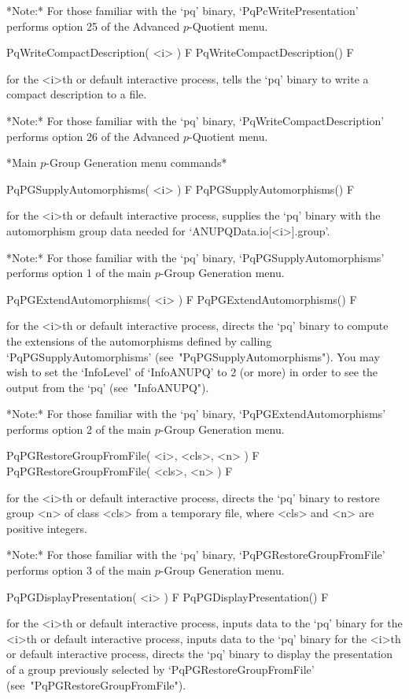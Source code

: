 *Note:* For those familiar with the `pq' binary,  `PqPcWritePresentation'
performs option 25 of the Advanced $p$-Quotient menu.

\>PqWriteCompactDescription( <i> ) F
\>PqWriteCompactDescription() F

for the <i>th or default interactive {\ANUPQ}  process,  tells  the  `pq'
binary to write a compact description to a file.

*Note:* 
For those familiar  with  the  `pq'  binary,  `PqWriteCompactDescription'
performs option 26 of the Advanced $p$-Quotient menu.

*Main $p$-Group Generation menu commands*

\>PqPGSupplyAutomorphisms( <i> ) F
\>PqPGSupplyAutomorphisms() F

for the <i>th or default interactive {\ANUPQ} process, supplies the  `pq'
binary    with    the    automorphism    group    data     needed     for
`ANUPQData.io[<i>].group'.

*Note:*
For  those  familiar  with  the  `pq'  binary,  `PqPGSupplyAutomorphisms'
performs option 1 of the main $p$-Group Generation menu.

\>PqPGExtendAutomorphisms( <i> ) F
\>PqPGExtendAutomorphisms() F

for the <i>th or default interactive {\ANUPQ} process, directs  the  `pq'
binary to compute the extensions of the automorphisms defined by  calling
`PqPGSupplyAutomorphisms' (see~"PqPGSupplyAutomorphisms"). You  may  wish
to set the `InfoLevel' of `InfoANUPQ' to 2 (or more) in order to see  the
output from the `pq' (see~"InfoANUPQ").

*Note:*    
For  those  familiar  with  the  `pq'  binary,  `PqPGExtendAutomorphisms'
performs option 2 of the main $p$-Group Generation menu. 

\>PqPGRestoreGroupFromFile( <i>, <cls>, <n> ) F
\>PqPGRestoreGroupFromFile( <cls>, <n> ) F

for the <i>th or default interactive {\ANUPQ} process, directs  the  `pq'
binary to restore group <n> of class <cls> from a temporary  file,  where
<cls> and <n> are positive integers.

*Note:* 
For those  familiar  with  the  `pq'  binary,  `PqPGRestoreGroupFromFile'
performs option 3 of the main $p$-Group Generation menu.

\>PqPGDisplayPresentation( <i> ) F
\>PqPGDisplayPresentation() F

for the <i>th or default interactive {\ANUPQ} process, inputs data to the
`pq' binary for the <i>th or default interactive {\ANUPQ} process, inputs
data to the `pq' binary for the <i>th  or  default  interactive  {\ANUPQ}
process, directs the `pq' binary to display the presentation of  a  group
previously         selected         by         `PqPGRestoreGroupFromFile'
(see~"PqPGRestoreGroupFromFile").

